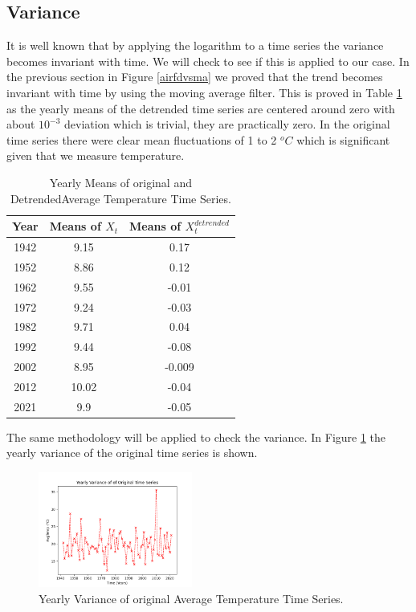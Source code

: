 \documentclass[conference]{IEEEtran}
\begin{document}
\subsection{Variance}

It is well known that by applying the logarithm to a time series the variance becomes invariant with time. We will check to see if this is applied to our case. In the previous section in Figure \ref{airfdvsma} we proved that the trend becomes invariant with time by using the moving average filter. This is proved in Table \ref{tablem} as the yearly means of the detrended time series are centered around zero with about $10^{-3}$ deviation which is trivial, they are practically zero. In the original time series there were clear mean fluctuations of 1 to 2 $^o C$ which is significant given that we measure temperature. 

\begin{table}
\begin{center}
\begin{tabular}{||c||c||c||} 
 \hline 
 Year & Means of $X_t$ & Means of $X_t^{detrended}$ \\ [0.5ex] 
 \hline\hline
 1942 & 9.15 & 0.17 \\ 
 \hline
 1952 & 8.86 & 0.12 \\
 \hline
 1962 & 9.55 & -0.01 \\
 \hline
 1972 & 9.24 & -0.03 \\
 \hline
 1982 & 9.71 & 0.04 \\
 \hline
 1992 & 9.44 & -0.08 \\
 \hline
 2002 & 8.95 & -0.009 \\
 \hline
 2012 & 10.02 & -0.04 \\
 \hline
 2021 & 9.9 & -0.05 \\
 \hline
\end{tabular}
\end{center}
\caption{Yearly Means of original and Detrended\break Average Temperature Time Series.}
\label{tablem}
\end{table}

The same methodology will be applied to check the variance. In Figure \ref{tempv} the yearly variance of the original time series is shown. 

\begin{figure}[ht]
    \centering
    \includegraphics[width=0.45\textwidth]{Figures/Yearly Variance of of Original Time Series.png}
    \caption{Yearly Variance of original Average Temperature Time Series.}
    \label{tempv}
\end{figure}
\end{document}
